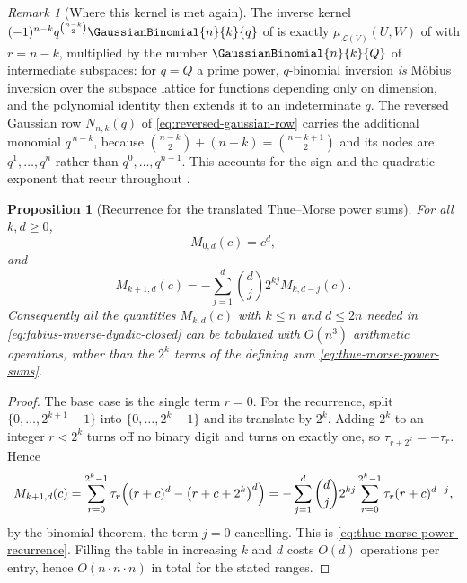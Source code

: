 \documentclass[11pt,a4paper,oneside,openany]{book}
\newtheorem{proposition}[proposition]{Proposition}
\theoremstyle{definition}
\theoremstyle{remark}
\newtheorem{remark}[remark]{Remark}
\newcommand{\SubspaceMobius}[3]{\mu_{\mathcal L(#1)}\!\left(#2,#3\right)}
\begin{document}
\begin{remark}[Where this kernel is met again]\label{rem:mobius-inversion-kernel}
The inverse kernel $(-1)^{n-k}q^{\binom{n-k}{2}}\GaussianBinomial{n}{k}{q}$ of  is exactly $\SubspaceMobius{V}{U}{W}$ of  with $r=n-k$, multiplied by the number $\GaussianBinomial{n}{k}{Q}$ of intermediate subspaces: for $q=Q$ a prime power, $q$-binomial inversion \emph{is} M\"obius inversion over the subspace lattice for functions depending only on dimension, and the polynomial identity then extends it to an indeterminate $q$.  The reversed Gaussian row $N_{n,k}(q)$ of \eqref{eq:reversed-gaussian-row} carries the additional monomial $q^{\,n-k}$, because
$\binom{n-k}{2}+(n-k)=\binom{n-k+1}{2}$ and its nodes are $q^1,\dots,q^n$ rather than $q^0,\dots,q^{n-1}$.  This accounts for the sign and the quadratic exponent that recur throughout .
\end{remark}



\begin{proposition}[Recurrence for the translated Thue--Morse power sums]\label{prop:thue-morse-power-recurrence}
For all $k,d\ge0$,
\begin{equation}\label{eq:thue-morse-power-base}
 M_{0,d}(c)=c^d,
\end{equation}
and
\begin{equation}\label{eq:thue-morse-power-recurrence}
 M_{k+1,d}(c)=-\sum_{j=1}^{d}\binom dj2^{kj}M_{k,d-j}(c).
\end{equation}
Consequently all the quantities $M_{k,d}(c)$ with $k\le n$ and $d\le2n$ needed in \eqref{eq:fabius-inverse-dyadic-closed} can be tabulated with $O(n^3)$ arithmetic operations, rather than the $2^k$ terms of the defining sum \eqref{eq:thue-morse-power-sums}.
\end{proposition}

\begin{proof}
The base case is the single term $r=0$.  For the recurrence, split $\{0,\dots,2^{k+1}-1\}$ into $\{0,\dots,2^k-1\}$ and its translate by $2^k$.  Adding $2^k$ to an integer $r<2^k$ turns off no binary digit and turns on exactly one, so $\tau_{r+2^k}=-\tau_r$.  Hence
\[
 M_{k+1,d}(c)
 =\sum_{r=0}^{2^k-1}\tau_r\Bigl((r+c)^d-\bigl(r+c+2^k\bigr)^d\Bigr)
 =-\sum_{j=1}^{d}\binom dj2^{kj}\sum_{r=0}^{2^k-1}\tau_r(r+c)^{d-j},
\]
by the binomial theorem, the term $j=0$ cancelling.  This is \eqref{eq:thue-morse-power-recurrence}.  Filling the table in increasing $k$ and $d$ costs $O(d)$ operations per entry, hence $O(n\cdot n\cdot n)$ in total for the stated ranges.
\end{proof}
\end{document}
